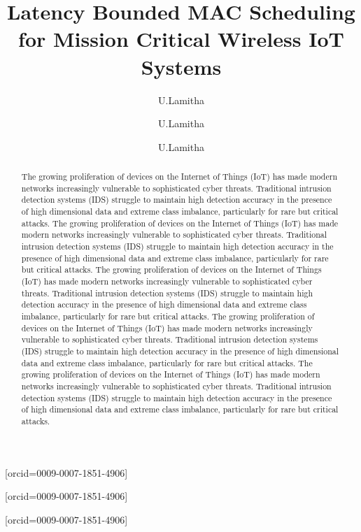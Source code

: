 \documentclass[a4paper,fleqn]{cas-dc}
\numberwithin{equation}{section}
\begin{document}
\let\WriteBookmarks\relax
\def\floatpagepagefraction{1}
\def\textpagefraction{.001}


\title [mode = title]{Latency Bounded MAC Scheduling for Mission Critical Wireless IoT Systems}                      


\author[1]{U.Lamitha}[orcid=0009-0007-1851-4906]
\address[1]{School of Computer Science and Engineering, VIT-AP University, Amaravathi. Andhra Pradesh, India}

%
\author[2]{U.Lamitha}[orcid=0009-0007-1851-4906]


\author[3]{U.Lamitha}[orcid=0009-0007-1851-4906]
%



\begin{abstract}
The growing proliferation of devices on the Internet of Things (IoT) has made modern networks increasingly vulnerable to sophisticated cyber threats. Traditional intrusion detection systems (IDS) struggle to maintain high detection accuracy in the presence of high dimensional data and extreme class imbalance, particularly for rare but critical attacks. The growing proliferation of devices on the Internet of Things (IoT) has made modern networks increasingly vulnerable to sophisticated cyber threats. Traditional intrusion detection systems (IDS) struggle to maintain high detection accuracy in the presence of high dimensional data and extreme class imbalance, particularly for rare but critical attacks. The growing proliferation of devices on the Internet of Things (IoT) has made modern networks increasingly vulnerable to sophisticated cyber threats. Traditional intrusion detection systems (IDS) struggle to maintain high detection accuracy in the presence of high dimensional data and extreme class imbalance, particularly for rare but critical attacks. The growing proliferation of devices on the Internet of Things (IoT) has made modern networks increasingly vulnerable to sophisticated cyber threats. Traditional intrusion detection systems (IDS) struggle to maintain high detection accuracy in the presence of high dimensional data and extreme class imbalance, particularly for rare but critical attacks. The growing proliferation of devices on the Internet of Things (IoT) has made modern networks increasingly vulnerable to sophisticated cyber threats. Traditional intrusion detection systems (IDS) struggle to maintain high detection accuracy in the presence of high dimensional data and extreme class imbalance, particularly for rare but critical attacks.
\end{abstract}
\end{document}
